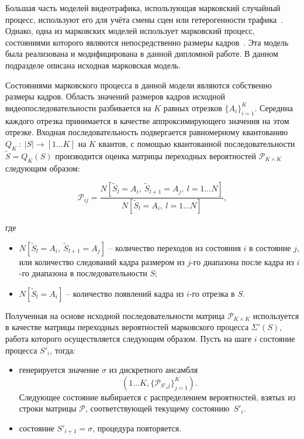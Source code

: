 Большая часть моделей видеотрафика, использующая марковский
случайный процесс, используют его для учёта смены сцен
или гетерогенности трафика~\cite{raey}. Однако, одна из
марковских моделей использует марковский процесс, состояниями
которого являются непосредственно размеры кадров~\cite{heymanATM}.
Эта модель была реализована и модифицирована в данной дипломной
работе. В данном подразделе описана исходная марковская модель.

Состояниями марковского процесса в данной модели являются
собственно размеры кадров. Область значений размеров кадров
исходной видеопоследовательности разбивается на $K$ равных
отрезков $\{A_i\} _{i=1}^K$.
Середина каждого отрезка принимается в качестве
аппроксимирующего значения на этом отрезке. Входная
последовательность подвергается равномерному квантованию $Q_K~:~|S|\rightarrow [1 \dots K]$
на $K$ квантов, с помощью квантованной последовательности
$\widetilde{S} = Q_K(S)$ производится оценка матрицы переходных
вероятностей $\mathcal{P}_{K\times K}$ следующим образом:

\begin{equation}
    \mathcal{P}_{ij} = \frac{N[\widetilde{S}_l = A_i,~\widetilde{S}_{l+1} = A_j,~l=1\dots N]}
                            {N[\widetilde{S}_l = A_i,~l=1\dots N]},
\end{equation}

где
\begin{itemize}
    \item $N[\widetilde{S}_l = A_i,~\widetilde{S}_{l+1} = A_j]$ -- количество переходов
        из состояния $i$ в состояние $j$, или количество следований кадра размером
        из $j$-го диапазона после кадра из $i$-го диапазона в последовательности $S$;
    \item $N[\widetilde{S}_l = A_i]$ -- количество появлений кадра из $i$-го отрезка в $S$.
\end{itemize}

Полученная на основе исходной последовательности матрица $\mathcal{P}_{K\times K}$
используется в качестве матрицы переходных вероятностей марковского процесса
$\Sigma'(S)$, работа которого осуществляется следующим образом. Пусть
на шаге $i$ состояние процесса $S'_i$, тогда:

\begin{itemize}
    \item генерируется значение $\sigma$ из дискретного ансамбля $$(1 \dots K, \{\mathcal{P}_{S'_ij}\} _{j = 1}^K).$$
        Следующее состояние выбирается с распределением вероятностей, взятых из строки матрицы $\mathcal{P}$,
        соответствующей текущему состоянию~$S'_i$.
    \item состояние $S'_{i+1} = \sigma$, процедура повторяется.
\end{itemize}

